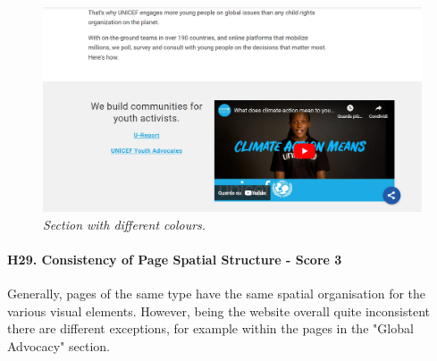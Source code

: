 \begin{figure}[h]
	\centering
	\begin{center}
		\includegraphics[width=\textwidth]{Picture31.png}
	\end{center}
	\captionsetup{font=small}
	\caption{\textit{Section with different colours.}}
	\label{fig:label23}
\end{figure}

\paragraph*{H29. Consistency of Page Spatial Structure  - Score 3}
Generally, pages of the same type have the same spatial organisation for the various visual elements. However, being the website overall quite inconsistent there are different exceptions, for example within the pages in the "Global Advocacy" section.